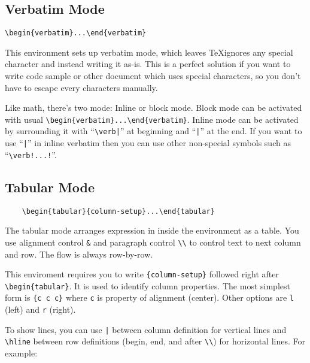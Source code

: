 	\subsection{Verbatim Mode}

	\noindent\verb|\begin{verbatim}...\end{verbatim}|

	This environment sets up verbatim mode, which leaves \TeX ignores any special character and instead writing it as-is. This is a perfect solution if you want to write code sample or other document which uses special characters, so you don't have to escape every characters manually.

	Like math, there's two mode: Inline or block mode. Block mode can be activated with usual \verb|\begin{verbatim}...\end{verbatim}|. Inline mode can be activated by surrounding it with ``\verb!\verb|!'' at beginning and ``\verb!|!'' at the end. If you want to use ``\verb!|!'' in inline verbatim then you can use other non-special symbols such as ``\verb|\verb!...!|''.

	\subsection{Tabular Mode}

	\begin{verbatim}
	\begin{tabular}{column-setup}...\end{tabular}
	\end{verbatim}

	The tabular mode arranges expression in inside the environment as a table. You use alignment control \verb|&| and paragraph control \verb|\\| to control text to next column and row. The flow is always row-by-row.

	This enviroment requires you to write \verb|{column-setup}| followed right after \verb|\begin{tabular}|. It is used to identify column properties. The most simplest form is \verb|{c c c}| where \verb|c| is property of alignment (center). Other options are \verb|l| (left) and \verb|r| (right).

	To show lines, you can use \verb!|! between column definition for vertical lines and \verb|\hline| between row definitions (begin, end, and after \verb|\\|) for horizontal lines. For example:


